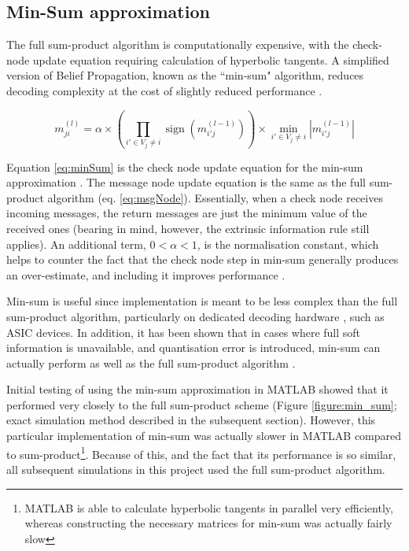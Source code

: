 \documentclass[11pt]{article}
\numberwithin{equation}{subsection}
\DeclareMathOperator{\sign}{sign}
\begin{document}
\subsection{Min-Sum approximation}

The full sum-product algorithm is computationally expensive, with the check-node update equation requiring calculation of hyperbolic tangents. A simplified version of Belief Propagation, known as the ``min-sum" algorithm, reduces decoding complexity at the cost of slightly reduced performance \cite{chen2005reduced}.

\begin{equation} \label{eq:minSum}
m_{ji}^{(l)} = \alpha\times\left(\prod\limits_{i'\in V_j\ne i}\sign(m_{i'j}^{(l-1)})\right)\times\min_{i'\in V_j\ne i}\left|m_{i'j}^{(l-1)}\right|
\end{equation} 

Equation \ref{eq:minSum} is the check node update equation for the min-sum approximation \cite{islam2011optimized}. The message node update equation is the same as the full sum-product algorithm (eq. \ref{eq:msgNode}). Essentially, when a check node receives incoming messages, the return messages are just the minimum value of the received ones (bearing in mind, however, the extrinsic information rule still applies). An additional term, $0 < \alpha < 1$, is the normalisation constant, which helps to counter the fact that the check node step in min-sum generally produces an over-estimate, and including it improves performance \cite{islam2011optimized}. 

Min-sum is useful since implementation is meant to be less complex than the full sum-product algorithm, particularly on dedicated decoding hardware \cite{chen2005reduced}, such as ASIC devices. In addition, it has been shown that in cases where full soft information is unavailable, and quantisation error is introduced, min-sum can actually perform as well as the full sum-product algorithm \cite{zhao2005implementation}.

Initial testing of using the min-sum approximation in {MATLAB} showed that it performed very closely to the full sum-product scheme (Figure \ref{figure:min_sum}; exact simulation method described in the subsequent section). However, this particular implementation of min-sum was actually slower in MATLAB compared to sum-product\footnote{MATLAB is able to calculate hyperbolic tangents in parallel very efficiently, whereas constructing the necessary matrices for min-sum was actually fairly slow}. Because of this, and the fact that its performance is so similar, all subsequent simulations in this project used the full sum-product algorithm.
\end{document}
